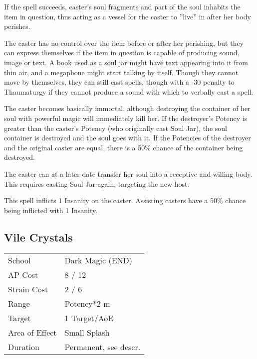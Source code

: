 \documentclass[11pt,a4paper,twocolumn]{book}
\begin{document}
If the spell succeeds, caster's soul fragments and part of the soul inhabits the item in question, thus acting as a vessel for the caster to ''live'' in after her body perishes.

The caster has no control over the item before or after her perishing, but they can express themselves if the item in question is capable of producing sound, image or text. A book used as a soul jar might have text appearing into it from thin air, and a megaphone might start talking by itself. Though they cannot move by themselves, they can still cast spells, though with a -30 penalty to Thaumaturgy if they cannot produce a sound with which to verbally cast a spell.

The caster becomes basically immortal, although destroying the container of her soul with powerful magic will immediately kill her. If the destroyer's Potency is greater than the caster's Potency (who originally cast Soul Jar), the soul container is destroyed and the soul goes with it. If the Potencies of the destroyer and the original caster are equal, there is a 50\% chance of the container being destroyed.

The caster can at a later date transfer her soul into a receptive and willing body. This requires casting Soul Jar again, targeting the new host.

This spell inflicts 1 Insanity on the caster. Assisting casters have a 50\% chance being inflicted with 1 Insanity.

\subsection*{Vile Crystals}
{
	\begin{tabu} to 75mm{| X[l,4] | X[l,7] |}
		\hline
		School 			& Dark Magic (END) 				\\
		AP Cost	      	& 8 / 12 						\\
		Strain Cost     & 2 / 6							\\
		Range     		& Potency*2 m 					\\
		Target      	& 1 Target/AoE					\\
		Area of Effect  & Small Splash 	 				\\
		Duration     	& Permanent, see descr.			\\ \hline
	\end{tabu}
	
}

\medskip
\end{document}
